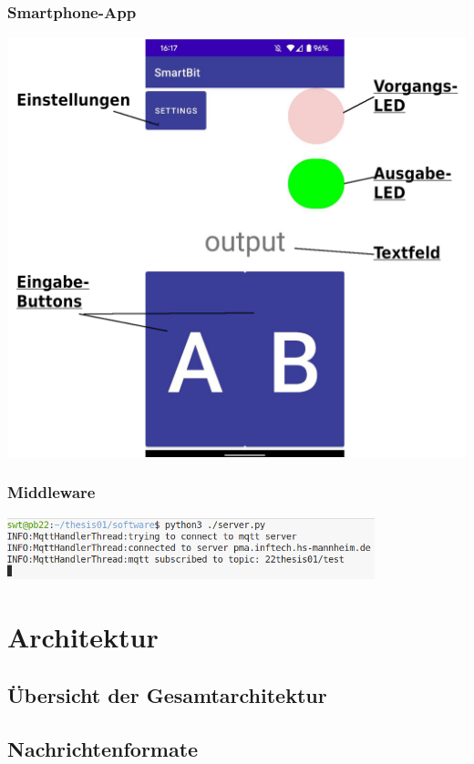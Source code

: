 \documentclass{beamer}
\begin{document}
\begin{frame}
    \frametitle{Smartphone-App}
    \centering
    \includegraphics[height=0.9\textheight]{images/app_initial.png}
\end{frame}

\begin{frame}[fragile]
    \frametitle{Middleware}
    \begin{center}
    \includegraphics[width=0.8\textwidth]{images/middleware.png}
    \end{center}
\end{frame}

\section{Architektur}
\begin{frame}
\end{frame}
\subsection*{Übersicht der Gesamtarchitektur}
\subsection*{Nachrichtenformate}
\end{document}
